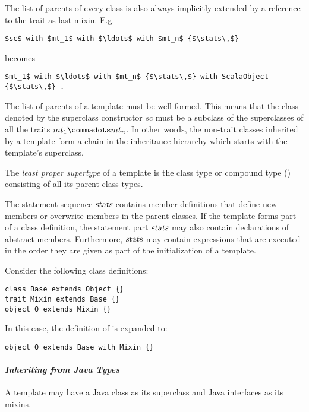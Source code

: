 The list of parents of every class is also always implicitly extended
by a reference to the  trait as last
mixin. E.g.\
\begin{lstlisting}
$sc$ with $mt_1$ with $\ldots$ with $mt_n$ {$\stats\,$}
\end{lstlisting}
becomes
\begin{lstlisting}
$mt_1$ with $\ldots$ with $mt_n$ {$\stats\,$} with ScalaObject {$\stats\,$} .
\end{lstlisting}

The list of parents of a template must be well-formed. This means that
the class denoted by the superclass constructor $sc$ must be a
subclass of the superclasses of all the traits $mt_1 \commadots mt_n$.
In other words, the non-trait classes inherited by a template form a
chain in the inheritance hierarchy which starts with the template's
superclass.

The {\em least proper supertype} of a template is the class type or
compound type (\sref{sec:compound-types}) consisting of all its parent
class types. 

The statement sequence $\mbox{\sl stats}$ contains member definitions that
define new members or overwrite members in the parent classes.  If the
template forms part of a class definition, the statement part $\mbox{\sl stats}$
may also contain declarations of abstract members. Furthermore,
$\mbox{\sl stats}$ may contain expressions that are executed in the order they
are given as part of the initialization of a template.


\example Consider the following class definitions:

\begin{lstlisting}
class Base extends Object {}
trait Mixin extends Base {}
object O extends Mixin {}
\end{lstlisting}
In this case, the definition of  is expanded to:
\begin{lstlisting}
object O extends Base with Mixin {}
\end{lstlisting}



\paragraph{\em Inheriting from Java Types} A template may have a Java class as
its superclass and Java interfaces as its mixins. 

